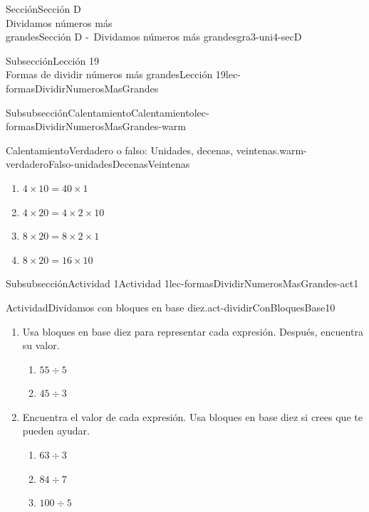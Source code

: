 \begin{sectionptx}{Sección}{{\Large Sección D\\}Dividamos números más\\grandes}{}{Sección D -~Dividamos números más grandes}{}{}{gra3-uni4-secD}
\begin{subsectionptx}{Subsección}{{\normalsize Lección 19\\[-0.05cm]}Formas de dividir números más grandes}{}{Lección 19}{}{}{lec-formasDividirNumerosMasGrandes}
\begin{subsubsectionptx}{Subsubsección}{Calentamiento}{}{Calentamiento}{}{}{lec-formasDividirNumerosMasGrandes-warm}
\begin{exploration}{Calentamiento}{Verdadero o falso: Unidades, decenas, veintenas.}{warm-verdaderoFalso-unidadesDecenasVeintenas}
%
\begin{enumerate}[label={\Alph*.}]
\item{}\(\displaystyle 4 \times 10 = 40 \times 1\)%
\item{}\(\displaystyle 4 \times 20 = 4 \times 2 \times 10\)%
\item{}\(\displaystyle 8 \times 20 = 8 \times 2 \times 1\)%
\item{}\(\displaystyle 8 \times 20 = 16 \times 10\)%
\end{enumerate}
\end{exploration}%
\end{subsubsectionptx}
%
%
\typeout{************************************************}
\typeout{************************************************}
%
\begin{subsubsectionptx}{Subsubsección}{Actividad 1}{}{Actividad 1}{}{}{lec-formasDividirNumerosMasGrandes-act1}
\begin{activity}{Actividad}{Dividamos con bloques en base diez.}{act-dividirConBloquesBase10}%
\begin{sidebyside}{2}{0}{0}{0.1}%
\begin{sbspanel}{0.7}%
%
\begin{enumerate}
\item{}Usa bloques en base diez para representar cada expresión. Después, encuentra su valor.%
%
\begin{enumerate}
\item{}\(\displaystyle 55 \div 5\)%
\item{}\(\displaystyle 45 \div 3\)%
\end{enumerate}
\item{}Encuentra el valor de cada expresión. Usa bloques en base diez si crees que te pueden ayudar.%
%
\begin{enumerate}
\item{}\(\displaystyle 63 \div 3\)%
\item{}\(\displaystyle 84 \div 7\)%
\item{}\(\displaystyle 100 \div 5\)%
\end{enumerate}
\end{enumerate}
\end{sbspanel}%
\begin{sbspanel}{0.2}%

\end{sbspanel}
\end{sidebyside}
\end{activity}
\end{subsubsectionptx}
\end{subsectionptx}
\end{sectionptx}
